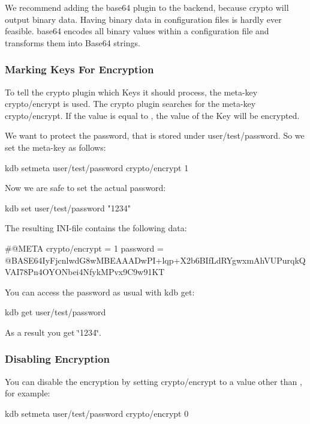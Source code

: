 We recommend adding the {\ttfamily base64} plugin to the backend, because {\ttfamily crypto} will output binary data. Having binary data in configuration files is hardly ever feasible. {\ttfamily base64} encodes all binary values within a configuration file and transforms them into Base64 strings.

\subsubsection*{Marking Keys For Encryption}

To tell the {\ttfamily crypto} plugin which Keys it should process, the meta-\/key {\ttfamily crypto/encrypt} is used. The {\ttfamily crypto} plugin searches for the meta-\/key {\ttfamily crypto/encrypt}. If the value is equal to {}, the value of the Key will be encrypted.

We want to protect the password, that is stored under {\ttfamily user/test/password}. So we set the meta-\/key as follows\+: \begin{DoxyVerb}    kdb setmeta user/test/password crypto/encrypt 1
\end{DoxyVerb}


Now we are safe to set the actual password\+: \begin{DoxyVerb}    kdb set user/test/password "1234"
\end{DoxyVerb}


The resulting I\+N\+I-\/file contains the following data\+: \begin{DoxyVerb}    #@META crypto/encrypt = 1
    password = @BASE64IyFjcnlwdG8wMBEAAADwPI+lqp+X2b6BIfLdRYgwxmAhVUPurqkQVAI78Pn4OYONbei4NfykMPvx9C9w91KT
\end{DoxyVerb}


You can access the password as usual with {\ttfamily kdb get}\+: \begin{DoxyVerb}    kdb get user/test/password
\end{DoxyVerb}


As a result you get \char`\"{}1234\char`\"{}.

\subsubsection*{Disabling Encryption}

You can disable the encryption by setting {\ttfamily crypto/encrypt} to a value other than {}, for example\+: \begin{DoxyVerb}    kdb setmeta user/test/password crypto/encrypt 0
\end{DoxyVerb}


